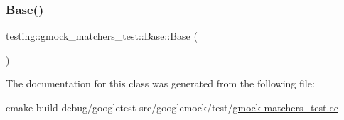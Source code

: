 \mbox{\label{classtesting_1_1gmock__matchers__test_1_1Base_ab3b2127992b81455804462897de44516}} 
\subsubsection{\texorpdfstring{Base()}{Base()}}
{\footnotesize\ttfamily testing\+::gmock\+\_\+matchers\+\_\+test\+::\+Base\+::\+Base (\begin{DoxyParamCaption}{ }\end{DoxyParamCaption})\hspace{0.3cm}{\ttfamily [inline]}}



The documentation for this class was generated from the following file\+:\begin{DoxyCompactItemize}
\item 
cmake-\/build-\/debug/googletest-\/src/googlemock/test/\mbox{\hyperlink{gmock-matchers__test_8cc}{gmock-\/matchers\+\_\+test.\+cc}}\end{DoxyCompactItemize}

